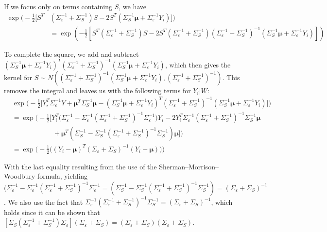 \documentclass[11pt]{article}
\begin{document}
If we focus only on terms containing $S$, we have 
$$
\begin{aligned}
    \exp\Big(-\frac{1}{2} \big[S^T &(\Sigma_\varepsilon^{-1}+\Sigma_S^{-1}) S 
    -2S^T (\Sigma_S^{-1} \boldsymbol{\mu} + \Sigma_\varepsilon^{-1} Y_i) \big]\Big) \\
&= \exp\left(-\frac{1}{2} \left[S^T (\Sigma_\varepsilon^{-1}+\Sigma_S^{-1}) S 
-2S^T (\Sigma_\varepsilon^{-1}+\Sigma_S^{-1})(\Sigma_\varepsilon^{-1}
+\Sigma_S^{-1})^{-1}(\Sigma_S^{-1} \boldsymbol{\mu} + \Sigma_\varepsilon^{-1} Y_i) \right]\right)
\end{aligned}
$$

To complete the square, we add and subtract $(\Sigma_S^{-1} \boldsymbol{\mu} 
+ \Sigma_\varepsilon^{-1} Y_i)^T(\Sigma_\varepsilon^{-1}+\Sigma_S^{-1})^{-1}
(\Sigma_S^{-1} \boldsymbol{\mu} + \Sigma_\varepsilon^{-1} Y_i)$, 
which then gives the kernel for $S \sim N\left((\Sigma_\varepsilon^{-1}
+\Sigma_S^{-1})^{-1}(\Sigma_S^{-1} \boldsymbol{\mu} + \Sigma_\varepsilon^{-1} Y_i), 
(\Sigma_\varepsilon^{-1}+\Sigma_S^{-1})^{-1} \right)$. 
This removes the integral and leaves us with the following terms for $Y_i|W$:
$$
\begin{aligned}
&\exp\Big(-\frac{1}{2}\big[Y_i^T\Sigma_\varepsilon^{-1} Y + 
\boldsymbol{\mu}^T\Sigma_S^{-1} \boldsymbol{\mu} - (\Sigma_S^{-1} \boldsymbol{\mu} + 
\Sigma_\varepsilon^{-1} Y_i)^T(\Sigma_\varepsilon^{-1}+\Sigma_S^{-1})^{-1} 
(\Sigma_S^{-1} \boldsymbol{\mu} + \Sigma_\varepsilon^{-1} Y_i)\big]\Big) \\
&= \exp\Big(-\frac{1}{2}\big[Y_i^T\big(\Sigma_\varepsilon^{-1} - 
\Sigma_\varepsilon^{-1}(\Sigma_\varepsilon^{-1}+\Sigma_S^{-1})^{-1}\Sigma_\varepsilon^{-1}\big)Y_i 
-2Y_i^T \Sigma_\varepsilon^{-1}(\Sigma_\varepsilon^{-1}+\Sigma_S^{-1})^{-1}\Sigma_S^{-1} \boldsymbol{\mu} \\
&\qquad \qquad \qquad + \boldsymbol{\mu}^T (\Sigma_S^{-1} - \Sigma_S^{-1}(\Sigma_\varepsilon^{-1}
+\Sigma_S^{-1})^{-1}\Sigma_S^{-1}) \boldsymbol{\mu}\big]\Big) \\
&= \exp\Big(-\frac{1}{2}\big((Y_i-\boldsymbol{\mu})^T(\Sigma_\varepsilon+\Sigma_S)^{-1}
(Y_i-\boldsymbol{\mu}) \big)\Big)
\end{aligned}
$$

With the last equality resulting from the use of the Sherman–Morrison–Woodbury formula, 
yielding $\big(\Sigma_\varepsilon^{-1} - \Sigma_\varepsilon^{-1}(\Sigma_\varepsilon^{-1}+
\Sigma_S^{-1})^{-1}\Sigma_\varepsilon^{-1} = (\Sigma_S^{-1} - \Sigma_S^{-1}
(\Sigma_\varepsilon^{-1}+\Sigma_S^{-1})^{-1}\Sigma_S^{-1}) = (\Sigma_\varepsilon+\Sigma_S)^{-1}$. 
We also use the fact that $\Sigma_\varepsilon^{-1}(\Sigma_\varepsilon^{-1}+
\Sigma_S^{-1})^{-1}\Sigma_S^{-1} = (\Sigma_\varepsilon + \Sigma_S)^{-1}$, 
which holds since it can be shown that 
$[\Sigma_S(\Sigma_\varepsilon^{-1}+\Sigma_S^{-1})\Sigma_\varepsilon](\Sigma_\varepsilon+\Sigma_S)
=(\Sigma_\varepsilon+\Sigma_S)(\Sigma_\varepsilon+\Sigma_S)$.
\end{document}

